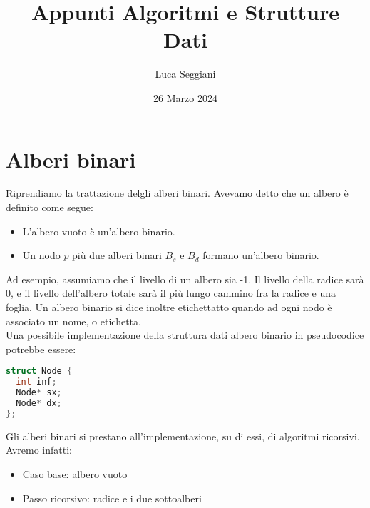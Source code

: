 \documentclass[a4paper,12pt]{article}
\title{Appunti Algoritmi e Strutture Dati}
\author{Luca Seggiani}
\date{26 Marzo 2024}
\begin{document}
\maketitle
\section{Alberi binari}
Riprendiamo la trattazione delgli alberi binari. Avevamo detto che un albero è definito come segue:
\begin{itemize}
  \item L'albero vuoto è un'albero binario.
  \item Un nodo $p$ più due alberi binari $B_s$ e $B_d$ formano un'albero binario.
\end{itemize}
Ad esempio, assumiamo che il livello di un albero sia -1. Il livello della radice sarà 0, e il livello
dell'albero totale sarà il più lungo cammino fra la radice e una foglia. Un albero binario si dice inoltre
etichettatto quando ad ogni nodo è associato un nome, o etichetta. \\
Una possibile implementazione della struttura dati albero binario in pseudocodice potrebbe essere:
\begin{lstlisting}[language=C++]
struct Node {
  int inf;
  Node* sx;
  Node* dx;
};
\end{lstlisting}

Gli alberi binari si prestano all'implementazione, su di essi, di algoritmi ricorsivi. Avremo infatti:
\begin{itemize}
  \item Caso base: albero vuoto
  \item Passo ricorsivo: radice e i due sottoalberi
\end{itemize}
\end{document}
